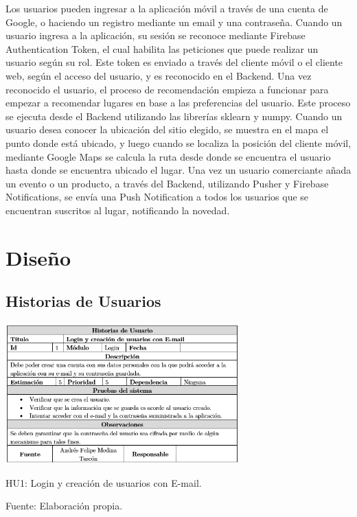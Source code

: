 \documentclass[12pt,letterpaper,openany]{book}
\begin{document}
Los usuarios pueden ingresar a la aplicación móvil a través de una cuenta de Google, o haciendo un registro mediante un email y una contraseña.
\vspace{5mm}\newline
Cuando un usuario ingresa a la aplicación, su sesión se reconoce mediante Firebase Authentication Token, el cual habilita las peticiones que puede realizar un usuario según su rol. Este token es enviado a través del cliente móvil o el cliente web, según el acceso del usuario, y es reconocido en el Backend.
\vspace{5mm}\newline
Una vez reconocido el usuario, el proceso de recomendación empieza a funcionar para empezar a recomendar lugares en base a las preferencias del usuario. Este proceso se ejecuta desde el Backend utilizando las librerías sklearn y numpy.
\vspace{5mm}\newline
Cuando un usuario desea conocer la ubicación del sitio elegido, se muestra en el mapa el punto donde está ubicado, y luego cuando se localiza la posición del cliente móvil, mediante Google Maps se calcula la ruta desde donde se encuentra el usuario hasta donde se encuentra ubicado el lugar.
\vspace{5mm}\newline
Una vez un usuario comerciante añada un evento o un producto, a través del Backend, utilizando Pusher y Firebase Notifications, se envía una Push Notification a todos los usuarios que se encuentran suscritos al lugar, notificando la novedad.




\section{Diseño}
\subsection{Historias de Usuarios}
\begin{table}[H]
\centering
\includegraphics[width=9cm]{./imagenes/HU/HU1}
\caption{HU1: Login y creación de usuarios con E-mail.}
\centering Fuente: Elaboración propia.
\end{table}
\end{document}

